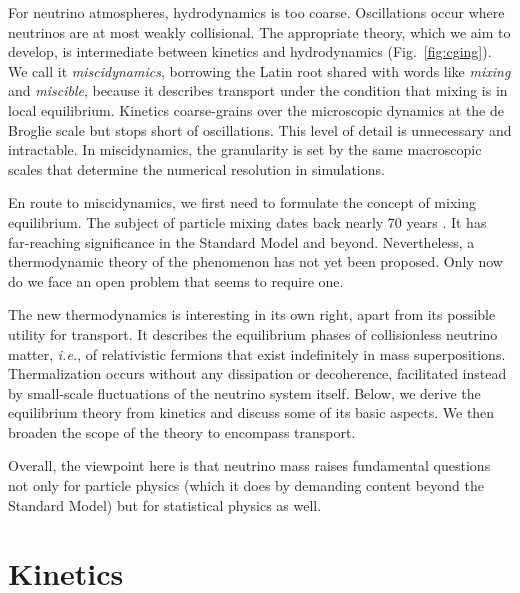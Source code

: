 \documentclass[aps,prd,twocolumn,groupedaddress,preprintnumbers]{revtex4-2}
\begin{document}
For neutrino atmospheres, hydrodynamics is too coarse. Oscillations occur where neutrinos are at most weakly collisional. The appropriate theory, which we aim to develop, is intermediate between kinetics and hydrodynamics (Fig.~\ref{fig:cging}). We call it \textit{miscidynamics}, borrowing the Latin root shared with words like \textit{mixing} and \textit{miscible}, because it describes transport under the condition that mixing is in local equilibrium. Kinetics coarse-grains over the microscopic dynamics at the de Broglie scale but stops short of oscillations. This level of detail is unnecessary and intractable. In miscidynamics, the granularity is set by the same macroscopic scales that determine the numerical resolution in simulations.

En route to miscidynamics, we first need to formulate the concept of mixing equilibrium. The subject of particle mixing dates back nearly 70 years \cite{gellmann1955, pontecorvo1957, feinberg1961}. It has far-reaching significance in the Standard Model and beyond. Nevertheless, a thermodynamic theory of the phenomenon has not yet been proposed. Only now do we face an open problem that seems to require one.

The new thermodynamics is interesting in its own right, apart from its possible utility for transport. It describes the equilibrium phases of collisionless neutrino matter, \textit{i.e.}, of relativistic fermions that exist indefinitely in mass superpositions. Thermalization occurs without any dissipation or decoherence, facilitated instead by small-scale fluctuations of the neutrino system itself. Below, we derive the equilibrium theory from kinetics and discuss some of its basic aspects. We then broaden the scope of the theory to encompass transport.

Overall, the viewpoint here is that neutrino mass raises fundamental questions not only for particle physics (which it does by demanding content beyond the Standard Model) but for statistical physics as well.




















\section{Kinetics}
\end{document}
